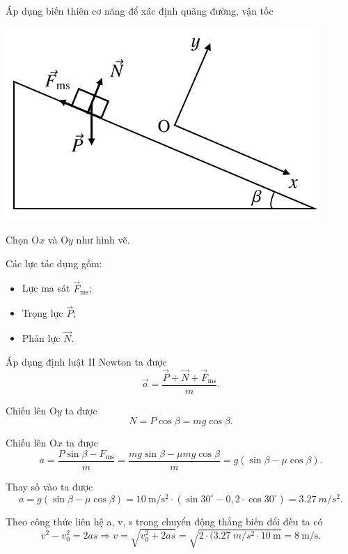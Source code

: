 \begin{dang}{Áp dụng biến thiên cơ năng để xác định quãng đường, vận tốc}
{		\begin{center}
			\includegraphics[scale=0.5]{../figs/VN10-PH-33-L-025-3-H2.jpg}
		\end{center}
		
		Chọn O$x$ và O$y$ như hình vẽ.
		
		Các lực tác dụng gồm:
		\begin{itemize}
			\item Lực ma sát $\vec{F}_\text{ms}$;
			\item Trọng lực $\vec{P}$;
			\item Phản lực $\vec{N}$.
		\end{itemize}
		
		Áp dụng định luật II Newton ta được
		\begin{equation*}
			\vec{a}=\dfrac{\vec{P}+\vec{N}+\vec{F}_\text{ms}}{m}.
		\end{equation*}
		
		Chiếu lên O$y$ ta được
		\begin{equation*}
			N = P\cos\beta = mg\cos\beta.
		\end{equation*}
		
		Chiếu lên O$x$ ta được
		\begin{equation*}
			a=\dfrac{P\sin\beta-F_\text{ms}}{m}=\dfrac{mg\sin\beta-\mu mg\cos\beta}{m}=g(\sin\beta-\mu\cos\beta).
		\end{equation*}
		
		Thay số vào ta được
		\begin{equation*}
			a=g(\sin\beta-\mu\cos\beta)=\SI{10}{\meter/\second^2}\cdot (\sin30^\circ-0,2\cdot\cos30^\circ)=\SI{3,27}{m/s^2}.
		\end{equation*}
		
		Theo công thức liên hệ a, v, s trong chuyển động thẳng biến đổi đều ta có
		\begin{equation*}
			v^2-v_0^2=2as\Rightarrow v=\sqrt{v_0^2+2as}=\sqrt{2\cdot (\SI{3,27}{m/s^2}\cdot \SI{10}{\meter}}= \SI{8}{\meter/\second}.
		\end{equation*}
		
}
\end{dang}
